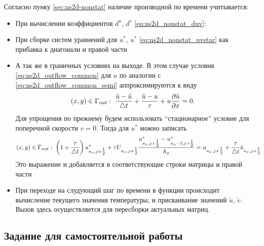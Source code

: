 Согласно пунку \ref{sec:ns2d-nonstat} наличие производной по времени
учитывается:
\begin{itemize}
\item
При вычислении коэффициентов $d^u$, $d^v$
\cref{eq:ns2d_nonstat_duv}:
\item
При сборке систем уравнений для $u^*$, $u^*$
\cref{eq:ns2d_nonstat_uvstar}
как прибавка к диагонали
и правой части
\item
А так же в граничных условиях на выходе.
В этом случае условия \cref{eq:ns2d_outflow_common}
для $u$ по аналогии с \cref{eq:ns2d_outflow_common_semi}
аппроксимируются к виду
\begin{equation*}
(x,y)\in\Gamma_{out}:\; \frac{\hat u - \check u}{\triangle t} + \frac{\hat u - u}{\tau} + u\frac{\partial \hat u}{\partial x} = 0.
\end{equation*}
Для упрощения по прежнему будем использовать ``стационарное'' условие
для поперечной скорости $v=0$.
Тогда для $u^*$ можно записать
$$
(x,y)\in\Gamma_{out}:\;
	\left(1 + \frac{\tau}{\triangle t}\right)u^*_{n_x, j+\tfrac12}
	+ \tau U_{n_x, j+\tfrac12}\frac{u^*_{n_x, j+\tfrac12}
					- u^*_{n_x-1, j+\tfrac12}}{h_x}
	= u_{n_x, j+\tfrac12}
	+ \frac\tau{\triangle t} \check u_{n_x, j+\tfrac12}
$$
Это выражение и добавляется в соответствующие строки матрицы и правой части
\item
При переходе на слудующий шаг по времени в функции
происходит вычисление текущего значения температуры, и
присваивание значений $\check u$, $\check v$.
Вызов  здесь осуществляется для пересборки актуальных матриц.

\end{itemize}

\subsection{Задание для самостоятельной работы}
